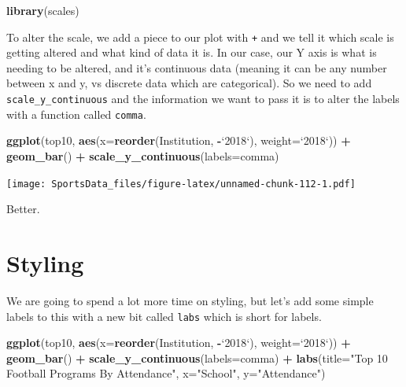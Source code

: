 \documentclass[]{book}
\newenvironment{Shaded}{\begin{snugshade}}{\end{snugshade}}
\newcommand{\KeywordTok}[1]{\textcolor[rgb]{0.13,0.29,0.53}{\textbf{#1}}}
\newcommand{\DataTypeTok}[1]{\textcolor[rgb]{0.13,0.29,0.53}{#1}}
\newcommand{\StringTok}[1]{\textcolor[rgb]{0.31,0.60,0.02}{#1}}
\newcommand{\OperatorTok}[1]{\textcolor[rgb]{0.81,0.36,0.00}{\textbf{#1}}}
\newcommand{\NormalTok}[1]{#1}
\begin{document}
\begin{Shaded}
\begin{Highlighting}[]
\KeywordTok{library}\NormalTok{(scales)}
\end{Highlighting}
\end{Shaded}

To alter the scale, we add a piece to our plot with \texttt{+} and we
tell it which scale is getting altered and what kind of data it is. In
our case, our Y axis is what is needing to be altered, and it's
continuous data (meaning it can be any number between x and y, vs
discrete data which are categorical). So we need to add
\texttt{scale\_y\_continuous} and the information we want to pass it is
to alter the labels with a function called \texttt{comma}.

\begin{Shaded}
\begin{Highlighting}[]
\KeywordTok{ggplot}\NormalTok{(top10, }\KeywordTok{aes}\NormalTok{(}\DataTypeTok{x=}\KeywordTok{reorder}\NormalTok{(Institution, }\OperatorTok{-}\StringTok{`}\DataTypeTok{2018}\StringTok{`}\NormalTok{), }\DataTypeTok{weight=}\StringTok{`}\DataTypeTok{2018}\StringTok{`}\NormalTok{)) }\OperatorTok{+}\StringTok{ }\KeywordTok{geom_bar}\NormalTok{() }\OperatorTok{+}\StringTok{ }\KeywordTok{scale_y_continuous}\NormalTok{(}\DataTypeTok{labels=}\NormalTok{comma)}
\end{Highlighting}
\end{Shaded}

\texttt{[image: SportsData\_files/figure-latex/unnamed-chunk-112-1.pdf]}

Better.

\section{Styling}\label{styling}

We are going to spend a lot more time on styling, but let's add some
simple labels to this with a new bit called \texttt{labs} which is short
for labels.

\begin{Shaded}
\begin{Highlighting}[]
\KeywordTok{ggplot}\NormalTok{(top10, }\KeywordTok{aes}\NormalTok{(}\DataTypeTok{x=}\KeywordTok{reorder}\NormalTok{(Institution, }\OperatorTok{-}\StringTok{`}\DataTypeTok{2018}\StringTok{`}\NormalTok{), }\DataTypeTok{weight=}\StringTok{`}\DataTypeTok{2018}\StringTok{`}\NormalTok{)) }\OperatorTok{+}\StringTok{ }\KeywordTok{geom_bar}\NormalTok{() }\OperatorTok{+}\StringTok{ }\KeywordTok{scale_y_continuous}\NormalTok{(}\DataTypeTok{labels=}\NormalTok{comma) }\OperatorTok{+}\StringTok{ }\KeywordTok{labs}\NormalTok{(}\DataTypeTok{title=}\StringTok{"Top 10 Football Programs By Attendance"}\NormalTok{, }\DataTypeTok{x=}\StringTok{"School"}\NormalTok{, }\DataTypeTok{y=}\StringTok{"Attendance"}\NormalTok{)}
\end{Highlighting}
\end{Shaded}
\end{document}
